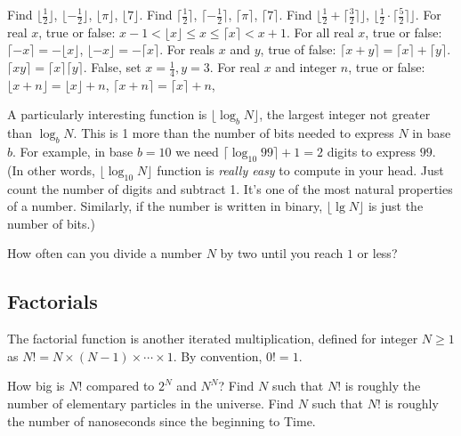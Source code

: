 \documentclass{tufte-handout}
\begin{document}
\begin{ExerciseList}
\Exercise Find $\lfloor \frac{1}{2}\rfloor$, $\lfloor
  -\frac{1}{2}\rfloor$,  $\lfloor \pi\rfloor$, $\lfloor 7\rfloor$.
\Exercise Find $\lceil \frac{1}{2}\rceil$, $\lceil
  -\frac{1}{2}\rceil$,  $\lceil \pi\rceil$, $\lceil 7\rceil$.
\Exercise Find
 $\lfloor \frac{1}{2}+\lceil \frac{3}{2}\rceil \rfloor$, 
 $\lfloor \frac{1}{2}\cdot \lceil \frac{5}{2}\rceil \rfloor$.
\Exercise For real $x$, true or false: $x-1<\lfloor x \rfloor \leq x \leq
  \lceil x\rceil < x+1$.
\Exercise For all real $x$, true or false: $\lceil -x\rceil = -\lfloor x\rfloor$,
  $\lfloor -x\rfloor = -\lceil x\rceil$.
\Exercise For reals $x$ and $y$, true of false: $\lceil x+y\rceil = \lceil
  x\rceil + \lceil y\rceil$. $\lceil xy\rceil =\lceil x\rceil \lceil
  y\rceil.$
  \Answer False, set $x=\frac{1}{4}, y=3$.
\Exercise For real $x$ and integer $n$, true or false:
  $\lfloor x+n\rfloor = \lfloor x\rfloor+n$,
  $\lceil x+n\rceil = \lceil x\rceil+n$,
\end{ExerciseList}

A particularly interesting function is $\lfloor \log_b N\rfloor$, the
largest integer not greater than $\log_b N$.  This is 1 more than the
number of bits needed to express $N$ in base $b$. For example, in base
$b=10$ we need $\lceil \log_{10} 99\rceil +1= 2$ digits to express
$99$. (In other words, $\lfloor \log_{10} N\rfloor$ function is
\emph{really easy} to compute in your head. Just count the number of
digits and subtract 1. It's one of the most natural properties of a
number. Similarly, if the number is written in binary, $\lfloor \lg N\rfloor$ is
just the number of bits.)

\begin{ExerciseList}
\Exercise How often can you divide a number $N$ by two until you reach $1$
  or less?
\end{ExerciseList}

\subsection{Factorials}

The factorial function is another iterated multiplication, defined for
integer $N\geq 1$ as $N!= N\times (N-1)\times \cdots \times 1$. By
convention, $0!=1$.


\begin{ExerciseList}
\Exercise How big is $N!$ compared to $2^N$ and $N^N$?
\Exercise Find $N$ such that $N!$ is roughly the number of elementary
  particles in the universe.
\Exercise Find $N$ such that $N!$ is roughly the number of nanoseconds
  since the beginning to Time.
\end{ExerciseList}
\end{document}
